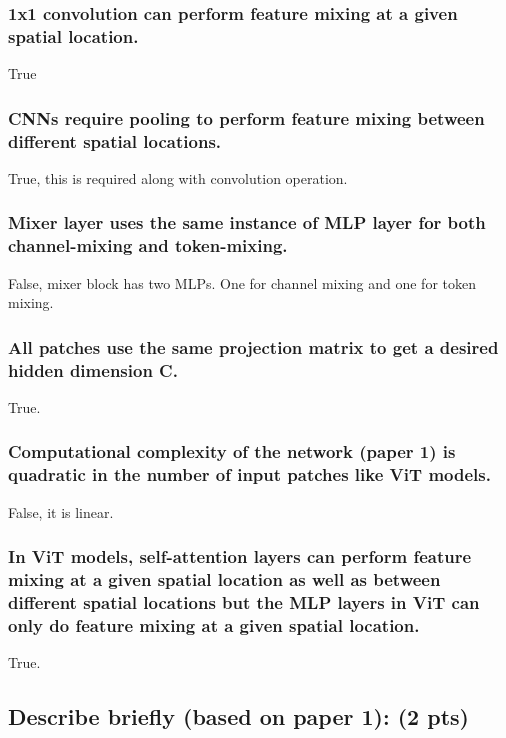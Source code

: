 \documentclass{article}
\begin{document}
\subsubsection{1x1 convolution can perform feature mixing at a given spatial location.}

True

\subsubsection{CNNs require pooling to perform feature mixing between different spatial locations.}

True, this is required along with convolution operation.


\subsubsection{Mixer layer uses the same instance of MLP layer for both channel-mixing and token-mixing.}

False, mixer block has two MLPs. One for channel mixing and one for token mixing.

\subsubsection{All patches use the same projection matrix to get a desired hidden dimension C.}

True.

\subsubsection{Computational complexity of the network (paper 1) is quadratic in the number of input patches like ViT models.}

False, it is linear.

\subsubsection{In ViT models, self-attention layers can perform feature mixing at a given spatial location as well as between different spatial locations but the MLP layers in ViT can only do feature mixing at a given spatial location.}

True.

\subsection{Describe briefly (based on paper 1): (2 pts)}
\end{document}
